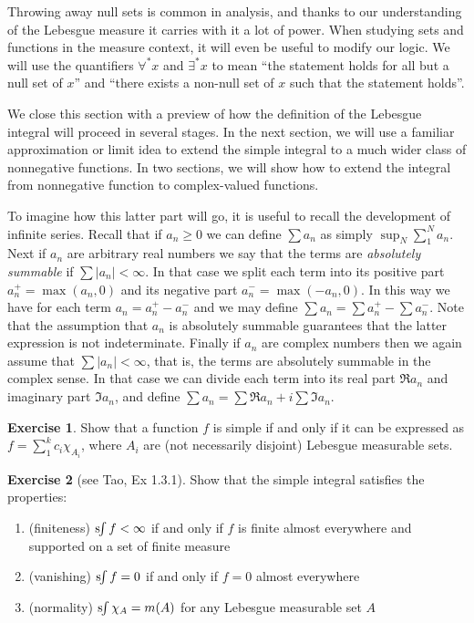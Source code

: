 \documentclass[10pt,oneside]{amsbook}
\newcommand{\sint}{\text{s}\kern-3pt\int}
\theoremstyle{definition}
\newtheorem{exerc}{Exercise}[section]
\theoremstyle{plain}
\theoremstyle{definition}
\theoremstyle{remark}
\numberwithin{equation}{section}
\numberwithin{figure}{section}
\begin{document}
Throwing away null sets is common in analysis, and thanks to our understanding of the Lebesgue measure it carries with it a lot of power. When studying sets and functions in the measure context, it will even be useful to modify our logic. We will use the quantifiers $\forall^*x$ and $\exists^*x$ to mean ``the statement holds for all but a null set of $x$'' and ``there exists a non-null set of $x$ such that the statement holds''.

We close this section with a preview of how the definition of the Lebesgue integral will proceed in several stages. In the next section, we will use a familiar approximation or limit idea to extend the simple integral to a much wider class of nonnegative functions. In two sections, we will show how to extend the integral from nonnegative function to complex-valued functions.

To imagine how this latter part will go, it is useful to recall the development of infinite series. Recall that if $a_n\geq0$ we can define $\sum a_n$ as simply $\sup_N\sum_1^Na_n$. Next if $a_n$ are arbitrary real numbers we say that the terms are \emph{absolutely summable} if $\sum|a_n|<\infty$. In that case we split each term into its positive part $a_n^+=\max(a_n,0)$ and its negative part $a_n^-=\max(-a_n,0)$. In this way we have for each term $a_n=a_n^+-a_n^-$ and we may define $\sum a_n=\sum a_n^+-\sum a_n^-$. Note that the assumption that $a_n$ is absolutely summable guarantees that the latter expression is not indeterminate. Finally if $a_n$ are complex numbers then we again assume that $\sum|a_n|<\infty$, that is, the terms are absolutely summable in the complex sense. In that case we can divide each term into its real part $\Re a_n$ and imaginary part $\Im a_n$, and define $\sum a_n=\sum\Re a_n+i\sum\Im a_n$.


\begin{exerc}
  Show that a function $f$ is simple if and only if it can be expressed as $f=\sum_1^kc_i\chi_{A_i}$, where $A_i$ are (not necessarily disjoint) Lebesgue measurable sets.
\end{exerc}

\begin{exerc}[see Tao, Ex 1.3.1]
  Show that the simple integral satisfies the properties:
  \begin{enumerate}
    \item (finiteness) $\sint f<\infty$ if and only if $f$ is finite almost everywhere and supported on a set of finite measure
    \item (vanishing) $\sint f=0$ if and only if $f=0$ almost everywhere
    \item (normality) $\sint\chi_A=m(A)$ for any Lebesgue measurable set $A$
  \end{enumerate}
\end{exerc}
\end{document}
